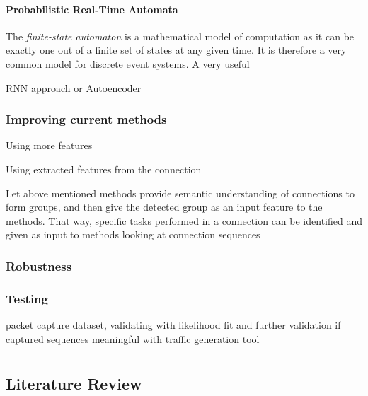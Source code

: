 \documentclass[a4paper,12pt,twoside]{report}
\begin{document}
\subsubsection{Probabilistic Real-Time Automata}

The \textit{finite-state automaton} is a mathematical model of computation as it can be exactly one out of a finite set of states at any given time. It is therefore a very common model for discrete event systems. A very useful 


RNN approach or Autoencoder

\subsection{Improving current methods}\label{Curmet}

Using more features

Using extracted features from the connection

Let above mentioned methods provide semantic understanding of connections to form groups, and then give the detected group as an input feature to the methods. That way, specific tasks performed in a connection can be identified and given as input to methods looking at connection sequences


\subsection{Robustness}\label{Robustness}

\subsection{Testing}

packet capture dataset, validating with likelihood fit and further validation if captured sequences meaningful with traffic generation tool


\appendix
\chapter{}
\section{Literature Review}\label{litreview}



\end{document}
